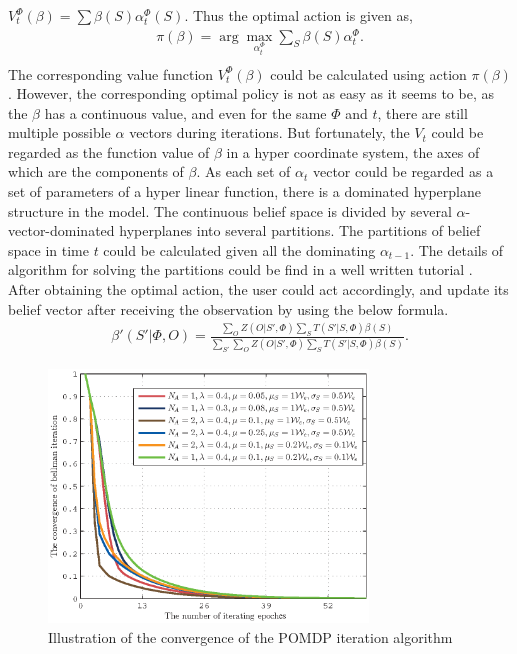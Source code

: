 \documentclass[conference]{IEEEtran}
\begin{document}
\(V_t^\Phi\left(\beta\right) = \sum\beta\left(S\right)\alpha_t^\Phi\left(S\right)\).
Thus the optimal action is given as,
\begin{equation}
\begin{aligned}
	\pi\left(\beta\right) =
	\arg\underset{\alpha_t^\Phi}{\max}\sum\limits_{S}\beta\left(S\right)\alpha_t^\Phi.\\
\end{aligned}
\end{equation}
The corresponding value function \(V_t^\Phi\left(\beta\right)\) could be calculated using action \(\pi\left(\beta\right)\).
However, the corresponding optimal policy is not as easy as it seems to be, as the \(\beta\) has a continuous value,
and even for the same \(\Phi\) and \(t\), there are still multiple possible \(\alpha\) vectors during iterations.
But fortunately, the \(V_t\) could be regarded as the function value of \(\beta\) in a hyper coordinate system,
the axes of which are the components of \(\beta\).
As each set of \(\alpha_t\) vector could be regarded as a set of parameters of a hyper linear function,
there is a dominated hyperplane structure in the model.
The continuous belief space is divided by several \(\alpha\)-vector-dominated hyperplanes into several partitions.
The partitions of belief space in time \(t\) could be calculated given all the dominating \(\alpha_{t-1}\).
The details of algorithm for solving the partitions could be find in a well written tutorial \cite{pomdptool}.\\
\indent
After obtaining the optimal action, the user could act accordingly,
and update its belief vector after receiving the observation by using the below formula.
\begin{align}
	\beta'\left(S'|\Phi, O\right) = \frac{\sum_{O}Z\left(O|S',\Phi\right)\sum_{S}
	T\left(S'|S,\Phi\right)\beta\left(S\right)}
	{\sum_{S'}\sum_{O}Z\left(O|S',\Phi\right)\sum_{S}T\left(S'|S,\Phi\right)\beta\left(S\right)}.
\end{align}
\begin{figure}
\centering
\includegraphics[width=8.5cm]{2_fig3.eps}
\caption{Illustration of the convergence of the POMDP iteration algorithm}
\end{figure}
\end{document}
